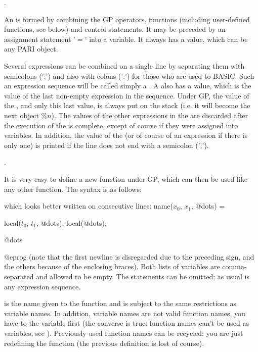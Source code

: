 .

  An  is formed by combining the
GP operators, functions (including user-defined functions, see below) and
control statements. It may be preceded by an assignment statement '$=$'
into a variable. It always has a value, which can be any PARI object.

  Several expressions can be combined on a single line by separating them
with semicolons (';') and also with colons (':') for those who are used to
BASIC. Such an expression sequence will be called simply a . A
 also has a value, which is the value of the last non-empty
expression in the sequence. Under GP, the value of the , and only
this last value, is always put on the stack (i.e. it will become the next
object $\%n$). The values of the other expressions in the  are
discarded after the execution of the  is complete, except of
course if they were assigned into variables. In addition, the value of
the  (or of course of an expression if there is only one) is
printed if the line does not end with a semicolon (';').

.
\label{se:user_defined}

It is very easy to define a new function under GP, which can then be used
like any other function. The syntax is as follows:

\kbd{);} 

\noindent which looks better written on consecutive lines:
\bprogpart
name($x_0$, $x_1$, @dots) = 
{
  local($t_0$, $t_1$, @dots);
  local(@dots);

  @dots
}
@eprog
\noindent (note that the first newline is disregarded due to the preceding
\kbd{=} sign, and the others because of the enclosing braces). Both lists
of variables are comma-separated and allowed to be empty. The 
statements can be omitted; as usual  is any expression sequence.

 is the name given to the function and is subject to the same
restrictions as variable names. In addition, variable names are not valid
function names, you have to  the variable first (the converse is
true: function names can't be used as variables, see ).
Previously used function names can be recycled: you are just redefining the
function (the previous definition is lost of course).

